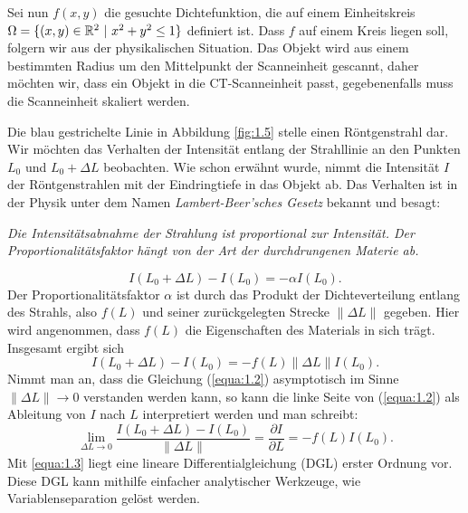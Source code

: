Sei nun $f(x,y)$ die gesuchte Dichtefunktion, die auf einem Einheitskreis $\Omega = \{ (x,y) \in \mathbb{R}^2 \ | \ x^2 + y^2 \leq 1 \}$ definiert ist. Dass $f$ auf einem Kreis liegen soll, folgern wir aus der physikalischen Situation. Das Objekt wird aus einem bestimmten Radius um den Mittelpunkt der Scanneinheit gescannt, daher möchten wir, dass ein Objekt in die CT-Scanneinheit passt, gegebenenfalls muss die Scanneinheit skaliert werden.

Die blau gestrichelte Linie in Abbildung \ref{fig:1.5} stelle einen Röntgenstrahl dar. Wir möchten das Verhalten der Intensität entlang der Strahllinie an den Punkten $L_0$ und $L_0 + \Delta L$ beobachten. Wie schon erwähnt wurde, nimmt die Intensität $I$ der Röntgenstrahlen mit der Eindringtiefe in das Objekt ab. Das Verhalten ist in der Physik unter dem Namen \textit{Lambert-Beer’sches Gesetz} bekannt und besagt:
\begin{center}
	\textit{Die Intensitätsabnahme der Strahlung ist proportional zur Intensität. Der Proportionalitätsfaktor hängt von der Art der durchdrungenen Materie ab.}
\end{center}
\begin{equation}
	I(L_0 + \Delta L) - I(L_0) = - \alpha I(L_0).
	\label{equa:1.100}
\end{equation}
Der Proportionalitätsfaktor $\alpha$ ist durch das Produkt der Dichteverteilung entlang des Strahls, also $f(L)$ und seiner zurückgelegten Strecke $\parallel \Delta L\parallel$ gegeben. Hier wird angenommen, dass $f(L)$ die Eigenschaften des Materials in sich trägt. Insgesamt ergibt sich
\begin{equation}
	I(L_0 + \Delta L) - I(L_0) = -f(L) \parallel \Delta L \parallel I(L_0).
	\label{equa:1.2}
\end{equation}
Nimmt man an, dass die Gleichung (\ref{equa:1.2}) asymptotisch im Sinne $\parallel \Delta L \parallel \rightarrow 0$ verstanden werden kann, so kann die linke Seite von (\ref{equa:1.2}) als Ableitung von $I$ nach $L$ interpretiert werden und man schreibt:
\begin{equation}
	\lim_{\Delta L\rightarrow 0}\frac{I(L_0 + \Delta L) - I(L_0)}{\parallel \Delta L \parallel} = \frac{\partial I}{\partial L} = -f(L)I(L_0).
	\label{equa:1.3}
\end{equation}
Mit \ref{equa:1.3} liegt eine lineare Differentialgleichung (DGL) erster Ordnung vor. Diese DGL kann mithilfe einfacher analytischer Werkzeuge, wie Variablenseparation gelöst werden. 
